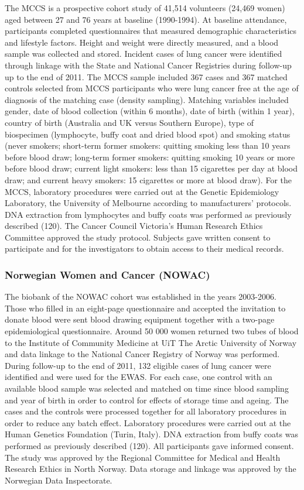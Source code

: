 \documentclass[11pt,oneside]{bristolthesis}
\begin{document}
The MCCS is a prospective cohort study of 41,514 volunteers (24,469 women) aged between 27 and 76 years at baseline (1990-1994). At baseline attendance, participants completed questionnaires that measured demographic characteristics and lifestyle factors. Height and weight were directly measured, and a blood sample was collected and stored. Incident cases of lung cancer were identified through linkage with the State and National Cancer Registries during follow-up up to the end of 2011. The MCCS sample included 367 cases and 367 matched controls selected from MCCS participants who were lung cancer free at the age of diagnosis of the matching case (density sampling). Matching variables included gender, date of blood collection (within 6 months), date of birth (within 1 year), country of birth (Australia and UK versus Southern Europe), type of biospecimen (lymphocyte, buffy coat and dried blood spot) and smoking status (never smokers; short-term former smokers: quitting smoking less than 10 years before blood draw; long-term former smokers: quitting smoking 10 years or more before blood draw; current light smokers: less than 15 cigarettes per day at blood draw; and current heavy smokers: 15 cigarettes or more at blood draw). For the MCCS, laboratory procedures were carried out at the Genetic Epidemiology Laboratory, the University of Melbourne according to manufacturers' protocols. DNA extraction from lymphocytes and buffy coats was performed as previously described (120). The Cancer Council Victoria's Human Research Ethics Committee approved the study protocol. Subjects gave written consent to participate and for the investigators to obtain access to their medical records.

\hypertarget{norwegian-women-and-cancer-nowac}{%
\subsubsection{Norwegian Women and Cancer (NOWAC)}\label{norwegian-women-and-cancer-nowac}}

The biobank of the NOWAC cohort was established in the years 2003-2006. Those who filled in an eight-page questionnaire and accepted the invitation to donate blood were sent blood drawing equipment together with a two-page epidemiological questionnaire. Around 50 000 women returned two tubes of blood to the Institute of Community Medicine at UiT The Arctic University of Norway and data linkage to the National Cancer Registry of Norway was performed. During follow-up to the end of 2011, 132 eligible cases of lung cancer were identified and were used for the EWAS. For each case, one control with an available blood sample was selected and matched on time since blood sampling and year of birth in order to control for effects of storage time and ageing. The cases and the controls were processed together for all laboratory procedures in order to reduce any batch effect. Laboratory procedures were carried out at the Human Genetics Foundation (Turin, Italy). DNA extraction from buffy coats was performed as previously described (120). All participants gave informed consent. The study was approved by the Regional Committee for Medical and Health Research Ethics in North Norway. Data storage and linkage was approved by the Norwegian Data Inspectorate.
\end{document}
